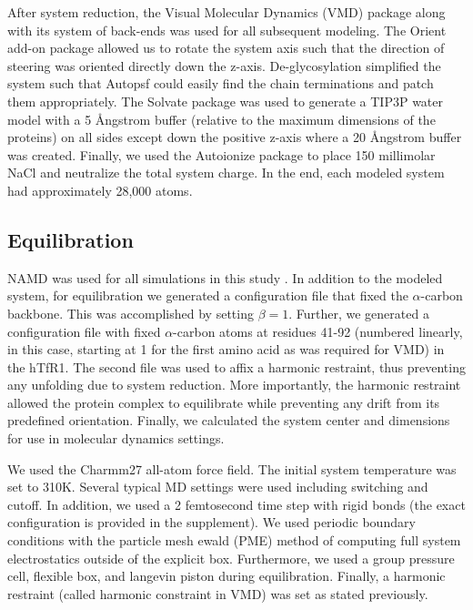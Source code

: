 \documentclass[journal=jacsat,manuscript=article]{achemso}
\begin{document}
After system reduction, the Visual Molecular Dynamics (VMD) \cite{Humphrey1996} package along with its system of back-ends was used for all subsequent modeling. The Orient add-on package allowed us to rotate the system axis such that the direction of steering was oriented directly down the z-axis. De-glycosylation simplified the system such that Autopsf could easily find the chain terminations and patch them appropriately. The Solvate package was used to generate a TIP3P water model with a 5 \AA ngstrom buffer (relative to the maximum dimensions of the proteins) on all sides except down the positive z-axis where a 20 \AA ngstrom buffer was created. Finally, we used the Autoionize package to place 150 millimolar NaCl and neutralize the total system charge. In the end, each modeled system had approximately 28,000 atoms.

\subsection{Equilibration}

NAMD was used for all simulations in this study \cite{Phillips2005}. In addition to the modeled system, for equilibration we generated a configuration file that fixed the $\alpha$-carbon backbone. This was accomplished by setting $\beta = 1$. Further, we generated a configuration file with fixed $\alpha$-carbon atoms at residues 41-92 (numbered linearly, in this case, starting at 1 for the first amino acid as was required for VMD) in the hTfR1. The second file was used to affix a harmonic restraint, thus preventing any unfolding due to system reduction. More importantly, the harmonic restraint allowed the protein complex to equilibrate while preventing any drift from its predefined orientation. Finally, we calculated the system center and dimensions for use in molecular dynamics settings.

We used the Charmm27 \cite{Brooks1983} all-atom force field. The initial system temperature was set to 310K. Several typical MD settings were used including switching and cutoff. In addition, we used a 2 femtosecond time step with rigid bonds (the exact configuration is provided in the supplement). We used periodic boundary conditions with the particle mesh ewald (PME) method of computing full system electrostatics outside of the explicit box. Furthermore, we used a group pressure cell, flexible box, and langevin piston during equilibration. Finally, a harmonic restraint (called harmonic constraint in VMD) was set as stated previously.
\end{document}
